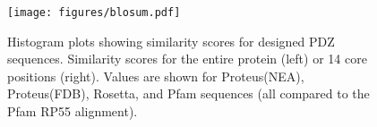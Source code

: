 \documentclass[a4paper,12pt]{article}
\begin{document}
\begin{figure}[!h]
\begin{center}
\vspace*{-1cm}
\texttt{[image: figures/blosum.pdf]}
\end{center}
\caption[width=1cm]{\small Histogram plots showing similarity scores for designed PDZ sequences. Similarity scores for the
entire protein (left) or 14 core positions (right). Values are shown for Proteus(NEA), Proteus(FDB), Rosetta, and Pfam sequences
(all compared to the Pfam RP55 alignment).} \label{fig:blosum}
\end{figure}
\end{document}

